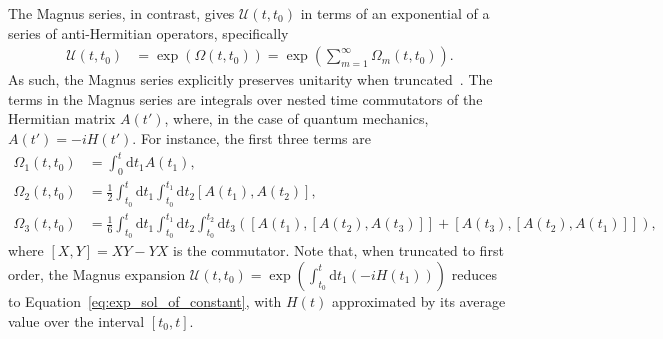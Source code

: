 \documentclass{jors}
\begin{document}
		The Magnus series, in contrast, gives $ \mathcal{U}(t, t_0) $ in terms of an exponential of a series of anti-Hermitian operators, specifically
		\begin{align}
			\mathcal{U}(t, t_0) &= \exp\left(\Omega(t, t_0)\right) = \exp\left(\sum_{m = 1}^\infty \Omega_m(t, t_0)\right).
		\end{align}
		As such, the Magnus series explicitly preserves unitarity when truncated~\cite{magnus_exponential_1954}.
		The terms in the Magnus series are integrals over nested time commutators of the Hermitian matrix $ A(t') $, where, in the case of quantum mechanics, $ A(t') = -iH(t') $.
		For instance, the first three terms are~\cite{blanes_magnus_2009}
		\begin{align}
			\Omega_1(t, t_0) &= \int_0^t\text{d}t_1A(t_1),\\
			\Omega_2(t, t_0) &= \frac12\int_{t_0}^t\text{d}t_1\int_{t_0}^{t_1}\text{d}t_2[A(t_1), A(t_2)],\\
			\Omega_3(t, t_0) &= \frac16\int_{t_0}^t\text{d}t_1\int_{t_0}^{t_1}\text{d}t_2\int_{t_0}^{t_2}\text{d}t_3\left([A(t_1), [A(t_2), A(t_3)]] + [A(t_3), [A(t_2), A(t_1)]]\right),
		\end{align}
		where $ [X, Y] = XY - YX $ is the commutator.
		Note that, when truncated to first order, the Magnus expansion $ \mathcal{U}(t, t_0) = \exp\left(\int_{t_0}^t\text{d}t_1\left(-iH(t_1)\right)\right) $ reduces to Equation~\eqref{eq:exp_sol_of_constant}, with $ H(t) $ approximated by its average value over the interval $ [t_0, t] $.

\end{document}
